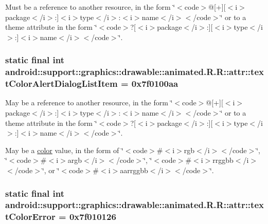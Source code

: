 Must be a reference to another resource, in the form \char`\"{}$<$code$>$@\mbox{[}+\mbox{]}\mbox{[}$<$i$>$package$<$/i$>$:\mbox{]}$<$i$>$type$<$/i$>$:$<$i$>$name$<$/i$>$$<$/code$>$\char`\"{} or to a theme attribute in the form \char`\"{}$<$code$>$?\mbox{[}$<$i$>$package$<$/i$>$:\mbox{]}\mbox{[}$<$i$>$type$<$/i$>$:\mbox{]}$<$i$>$name$<$/i$>$$<$/code$>$\char`\"{}. \hypertarget{classandroid_1_1support_1_1graphics_1_1drawable_1_1animated_1_1_r_1_1attr_6bcf4b82ed87d9a153e62c3755c024ad}{
\subsubsection[{textColorAlertDialogListItem}]{\setlength{\rightskip}{0pt plus 5cm}static final int android::support::graphics::drawable::animated.R.R::attr::textColorAlertDialogListItem = 0x7f0100aa}}
\label{classandroid_1_1support_1_1graphics_1_1drawable_1_1animated_1_1_r_1_1attr_6bcf4b82ed87d9a153e62c3755c024ad}


May be a reference to another resource, in the form \char`\"{}$<$code$>$@\mbox{[}+\mbox{]}\mbox{[}$<$i$>$package$<$/i$>$:\mbox{]}$<$i$>$type$<$/i$>$:$<$i$>$name$<$/i$>$$<$/code$>$\char`\"{} or to a theme attribute in the form \char`\"{}$<$code$>$?\mbox{[}$<$i$>$package$<$/i$>$:\mbox{]}\mbox{[}$<$i$>$type$<$/i$>$:\mbox{]}$<$i$>$name$<$/i$>$$<$/code$>$\char`\"{}. 

May be a \hyperlink{classandroid_1_1support_1_1graphics_1_1drawable_1_1animated_1_1_r_1_1color}{color} value, in the form of \char`\"{}$<$code$>$\#$<$i$>$rgb$<$/i$>$$<$/code$>$\char`\"{}, \char`\"{}$<$code$>$\#$<$i$>$argb$<$/i$>$$<$/code$>$\char`\"{}, \char`\"{}$<$code$>$\#$<$i$>$rrggbb$<$/i$>$$<$/code$>$\char`\"{}, or \char`\"{}$<$code$>$\#$<$i$>$aarrggbb$<$/i$>$$<$/code$>$\char`\"{}. \hypertarget{classandroid_1_1support_1_1graphics_1_1drawable_1_1animated_1_1_r_1_1attr_41653d580a0c20506dc14cf8cd4253cf}{
\subsubsection[{textColorError}]{\setlength{\rightskip}{0pt plus 5cm}static final int android::support::graphics::drawable::animated.R.R::attr::textColorError = 0x7f010126}}
\label{classandroid_1_1support_1_1graphics_1_1drawable_1_1animated_1_1_r_1_1attr_41653d580a0c20506dc14cf8cd4253cf}


